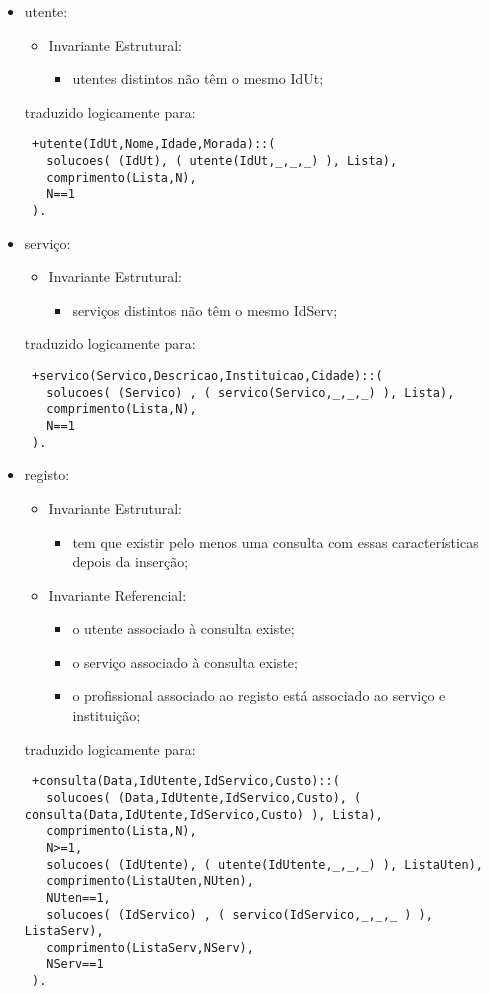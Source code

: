 \documentclass[
  oneside,
  10pt, a4paper,
  footinclude=true,
  headinclude=true,
  cleardoublepage=empty
]{scrbook}
\begin{document}
\begin{itemize}

\item   utente:
\begin{itemize}
\item        Invariante Estrutural:
\begin{itemize}
\item           utentes distintos não têm o mesmo IdUt;
\end{itemize}
\end{itemize}

traduzido logicamente para:
\begin{lstlisting}
 +utente(IdUt,Nome,Idade,Morada)::(
   solucoes( (IdUt), ( utente(IdUt,_,_,_) ), Lista),
   comprimento(Lista,N),
   N==1
 ).
\end{lstlisting}



\item   serviço:
\begin{itemize}
\item        Invariante Estrutural:
\begin{itemize}
\item         serviços distintos não têm o mesmo IdServ;
\end{itemize}
\end{itemize}
traduzido logicamente para:
\begin{lstlisting}
 +servico(Servico,Descricao,Instituicao,Cidade)::(
   solucoes( (Servico) , ( servico(Servico,_,_,_) ), Lista),
   comprimento(Lista,N),
   N==1
 ).
\end{lstlisting}


\item   registo:
\begin{itemize}
\item        Invariante Estrutural:
\begin{itemize}
\item         tem que existir pelo menos uma consulta com essas características depois da inserção;
\end{itemize}
\item        Invariante Referencial:
\begin{itemize}
\item         o utente associado à consulta existe;
\item         o serviço associado à consulta existe;
\item 	o profissional associado ao registo está associado ao serviço e instituição;
\end{itemize}
\end{itemize}
traduzido logicamente para:
\begin{lstlisting}
 +consulta(Data,IdUtente,IdServico,Custo)::(
   solucoes( (Data,IdUtente,IdServico,Custo), ( consulta(Data,IdUtente,IdServico,Custo) ), Lista),
   comprimento(Lista,N),
   N>=1,
   solucoes( (IdUtente), ( utente(IdUtente,_,_,_) ), ListaUten),
   comprimento(ListaUten,NUten),
   NUten==1,
   solucoes( (IdServico) , ( servico(IdServico,_,_,_ ) ), ListaServ),
   comprimento(ListaServ,NServ),
   NServ==1
 ).
\end{lstlisting}


\end{itemize}
\end{document}

